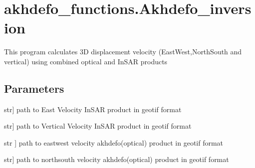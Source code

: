 \documentclass[letterpaper,10pt]{sphinxmanual}
\begin{document}
\chapter{akhdefo\_functions.Akhdefo\_inversion}
\label{\detokenize{generated/akhdefo_functions.Akhdefo_inversion:akhdefo-functions-akhdefo-inversion}}\label{\detokenize{generated/akhdefo_functions.Akhdefo_inversion::doc}}

\begin{fulllineitems}
\label{\detokenize{generated/akhdefo_functions.Akhdefo_inversion:akhdefo_functions.Akhdefo_inversion}}
\pysigstartsignatures
{}
\pysigstopsignatures
\sphinxAtStartPar
This program calculates 3D displacement velocity (East\sphinxhyphen{}West,North\sphinxhyphen{}South and vertical) using combined optical and InSAR products


\section{Parameters}
\label{\detokenize{generated/akhdefo_functions.Akhdefo_inversion:parameters}}\begin{description}
\sphinxlineitem{horizontal\_InSAR}{[}str{]}
\sphinxAtStartPar
path to East Velocity InSAR product in geotif format

\sphinxlineitem{Vertical\_InSAR}{[}str{]}
\sphinxAtStartPar
path to Vertical Velocity InSAR product in geotif format

\sphinxlineitem{EW\_Akhdefo}{[}str {]}
\sphinxAtStartPar
path to east\sphinxhyphen{}west velocity  akhdefo(optical) product in geotif format

\sphinxlineitem{NS\_Akhdefo}{[}str{]}
\sphinxAtStartPar
path to north\sphinxhyphen{}south velocity  akhdefo(optical) product in geotif format


\end{description}
\end{fulllineitems}
\end{document}
